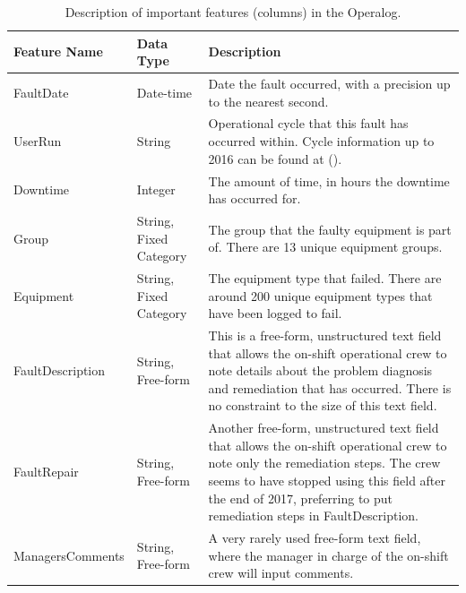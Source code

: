 \documentclass[10pt,oneside]{report}
\begin{document}
\begin{table}[htbp]
    \fontsize{8}{10}\selectfont
    \centering
    \begin{adjustbox}{max width=\textwidth}
    \begin{tabular}{p{3cm} p{4cm} p{10cm}}
        \toprule
        \textbf{Feature Name} & \textbf{Data Type} & \textbf{Description} \\
        \midrule
        FaultDate & Date-time & Date the fault occurred, with a precision up to the nearest second. \\
        UserRun & String & Operational cycle that this fault has occurred within. Cycle information up to 2016 can be found at (\citet{isisbeamoperations2024}). \\
        Downtime & Integer & The amount of time, in hours the downtime has occurred for. \\
        Group & String, Fixed Category & The group that the faulty equipment is part of. There are 13 unique equipment groups. \\
        Equipment & String, Fixed Category & The equipment type that failed. There are around 200 unique equipment types that have been logged to fail. \\
        FaultDescription & String, Free-form & This is a free-form, unstructured text field that allows the on-shift operational crew to note details about the problem diagnosis and remediation that has occurred. There is no constraint to the size of this text field.\\
        FaultRepair & String, Free-form & Another free-form, unstructured text field that allows the on-shift operational crew to note only the remediation steps. The crew seems to have stopped using this field after the end of 2017, preferring to put remediation steps in FaultDescription. \\
        ManagersComments & String, Free-form & A very rarely used free-form text field, where the manager in charge of the on-shift crew will input comments. \\
        \bottomrule
    \end{tabular}
    \end{adjustbox}
    \caption{Description of important features (columns) in the Operalog.}
    \label{tab:operalog}
\end{table}
\end{document}
